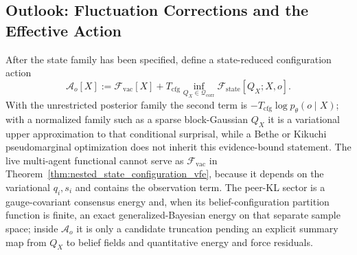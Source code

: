 \documentclass[11pt]{article}
\begin{document}
\subsection{Outlook: Fluctuation Corrections and the Effective Action}

After the state family has been specified, define a state-reduced configuration action
\begin{equation}
\mathcal{A}_o[X]
:=\mathcal{F}_{\mathrm{vac}}[X]
+T_{\mathrm{cfg}}
\inf_{Q_X\in\mathcal{Q}_{\mathrm{corr}}}
\mathcal{F}_{\mathrm{state}}[Q_X;X,o].
\label{eq:beyond_mf_bare_action}
\end{equation}
With the unrestricted posterior family the second term is $-T_{\mathrm{cfg}}\log p_\theta(o\mid X)$; with a normalized family such as a sparse block-Gaussian $Q_X$ it is a variational upper approximation to that conditional surprisal, while a Bethe or Kikuchi pseudomarginal optimization does not inherit this evidence-bound statement. The live multi-agent functional cannot serve as $\mathcal{F}_{\mathrm{vac}}$ in Theorem~\ref{thm:nested_state_configuration_vfe}, because it depends on the variational $q_i,s_i$ and contains the observation term. The peer-KL sector is a gauge-covariant consensus energy and, when its belief-configuration partition function is finite, an exact generalized-Bayesian energy on that separate sample space; inside $\mathcal{A}_o$ it is only a candidate truncation pending an explicit summary map from $Q_X$ to belief fields and quantitative energy and force residuals.
\end{document}
